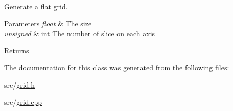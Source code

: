 Generate a flat grid. 


\begin{DoxyParams}{Parameters}
{\em float} & The size \\
\hline
{\em unsigned} & int The number of slice on each axis \\
\hline
\end{DoxyParams}
\begin{DoxyReturn}{Returns}

\end{DoxyReturn}


The documentation for this class was generated from the following files\+:\begin{DoxyCompactItemize}
\item 
src/\hyperlink{grid_8h}{grid.\+h}\item 
src/\hyperlink{grid_8cpp}{grid.\+cpp}\end{DoxyCompactItemize}
